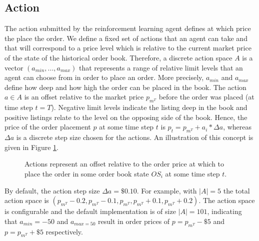 \subsection{Action}
The action submitted by the reinforcement learning agent defines at which price the place the order.
We define a fixed set of actions that an agent can take and that will correspond to a price level which is relative to the current market price of the state of the historical order book.
Therefore, a discrete action space $A$ is a vector $(a_{min}, . . . , a_{max})$ that represents a range of relative limit levels that an agent can choose from in order to place an order. 
More precisely, $a_{min}$ and $a_{max}$ define how deep and how high the order can be placed in the book.
The action $a \in A$ is an offset relative to the market price $p_{m^T}$ before the order was placed (at time step $t=T$).
Negative limit levels indicate the listing deep in the book and positive listings relate to the level on the opposing side of the book.
Hence, the price of the order placement $p$ at some time step $t$ is $p_t = p_{m^T} + a_i * \Delta{a}$, whereas $\Delta{a}$ is a discrete step size chosen for the actions.
An illustration of this concept is given in Figure \ref{fig:setup-actions}.
\begin{figure}[H]
    \centering
    \caption{Actions represent an offset relative to the order price at which to place the order in some order book state $OS_i$ at some time step $t$.}
    \label{fig:setup-actions}
\end{figure}
By default, the action step size $\Delta{a}=\$0.10$.
For example, with $|A|=5$ the total action space is $(p_{m^T}-0.2, p_{m^T}-0.1, p_{m^T}, p_{m^T}+0.1, p_{m^T}+0.2)$.
The action space is configurable and the default implementation is of size $|A|=101$, indicating that $a_{min}=-50$ and $a_{max=50}$ result in order prices of $p=p_{m^T}-\$5$ and $p=p_{m^T}+\$5$ respectively.

